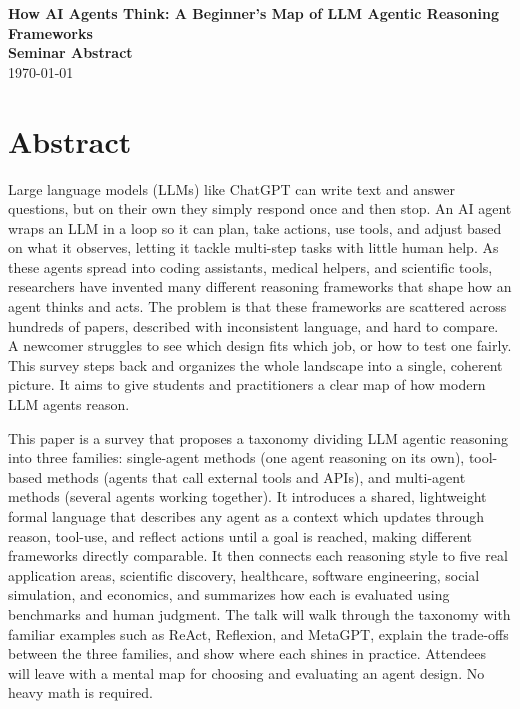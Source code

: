 \documentclass[12pt]{article}
\newcommand{\seminardate}{\today}
\begin{document}
\begin{center}
  {\LARGE\bfseries How AI Agents Think: A Beginner's Map of LLM Agentic Reasoning Frameworks}\\[8pt]
  {\large\bfseries Seminar Abstract}\\[6pt]
  {\normalsize \seminardate}
\end{center}
\vspace{1.5em}

\section*{Abstract}
Large language models (LLMs) like ChatGPT can write text and answer questions, but on their own they simply respond once and then stop. An AI agent wraps an LLM in a loop so it can plan, take actions, use tools, and adjust based on what it observes, letting it tackle multi-step tasks with little human help. As these agents spread into coding assistants, medical helpers, and scientific tools, researchers have invented many different reasoning frameworks that shape how an agent thinks and acts. The problem is that these frameworks are scattered across hundreds of papers, described with inconsistent language, and hard to compare. A newcomer struggles to see which design fits which job, or how to test one fairly. This survey steps back and organizes the whole landscape into a single, coherent picture. It aims to give students and practitioners a clear map of how modern LLM agents reason.

This paper is a survey that proposes a taxonomy dividing LLM agentic reasoning into three families: single-agent methods (one agent reasoning on its own), tool-based methods (agents that call external tools and APIs), and multi-agent methods (several agents working together). It introduces a shared, lightweight formal language that describes any agent as a context which updates through reason, tool-use, and reflect actions until a goal is reached, making different frameworks directly comparable. It then connects each reasoning style to five real application areas, scientific discovery, healthcare, software engineering, social simulation, and economics, and summarizes how each is evaluated using benchmarks and human judgment. The talk will walk through the taxonomy with familiar examples such as ReAct, Reflexion, and MetaGPT, explain the trade-offs between the three families, and show where each shines in practice. Attendees will leave with a mental map for choosing and evaluating an agent design. No heavy math is required.
\end{document}
